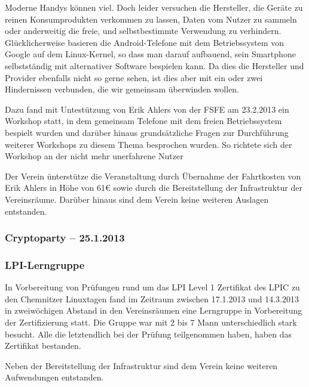\documentclass[10pt,DIV16]{scrartcl}
\begin{document}
Moderne Handys können viel. Doch leider versuchen die Hersteller,
die Geräte zu reinen Konsumprodukten verkommen zu lassen, Daten vom
Nutzer zu sammeln oder anderweitig die freie, und selbstbestimmte
Verwendung zu verhindern. Glücklicherweise basieren die
Android-Telefone mit dem Betriebssystem von Google auf dem
Linux-Kernel, so dass man darauf aufbauend, sein Smartphone
selbstständig mit alternativer Software bespielen kann. Da dies die
Hersteller und Provider ebenfalls nicht so gerne sehen, ist dies
aber mit ein oder zwei Hindernissen verbunden, die wir gemeinsam
überwinden wollen.

Dazu fand mit Untestützung von Erik Ahlers von der FSFE am 23.2.2013
ein Workshop statt, in dem gemeinsam Telefone mit dem freien
Betriebssystem bespielt wurden und darüber hinaus grundsätzliche
Fragen zur Durchführung weiterer Workshops zu diesem Thema
besprochen wurden. So richtete sich der Workshop an der nicht mehr
unerfahrene Nutzer

Der Verein ünterstütze die Veranstaltung durch Übernahme der
Fahrtkosten von Erik Ahlers in Höhe von 61\euro{} sowie durch die
Bereitstellung der Infrastruktur der Vereinsräume. Darüber hinaus
sind dem Verein keine weiteren Auslagen entstanden.

\subsubsection{Cryptoparty -- 25.1.2013}

\subsubsection{LPI-Lerngruppe}

In Vorbereitung von Prüfungen rund um das LPI Level 1 Zertifikat des
LPIC zu den Chemnitzer Linuxtagen fand im Zeitraum zwischen
17.1.2013 und 14.3.2013 in zweiwöchigen Abstand in den Vereinsräumen
eine Lerngruppe in Vorbereitung der Zertifizierung statt. Die Gruppe
war mit 2 bis 7 Mann unterschiedlich stark besucht. Alle die
letztendlich bei der Prüfung teilgenommen haben, haben das
Zertifikat bestanden.

Neben der Bereitstellung der Infrastruktur sind dem Verein keine
weiteren Aufwendungen entstanden.
\end{document}
